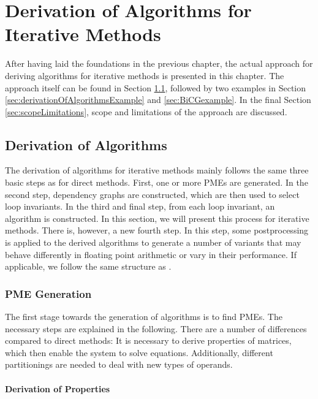 \chapter{Derivation of Algorithms for Iterative Methods}
\label{chap:derivationIM}

After having laid the foundations in the previous chapter, the actual approach for deriving algorithms for iterative methods is presented in this chapter. The approach itself can be found in Section \ref{sec:derivationIterativeMethods}, followed by two examples in Section \ref{sec:derivationOfAlgorithmsExample} and \ref{sec:BiCGexample}. In the final Section \ref{sec:scopeLimitations}, scope and limitations of the approach are discussed.

\section{Derivation of Algorithms}
\label{sec:derivationIterativeMethods}

The derivation of algorithms for iterative methods mainly follows the same three basic steps as for direct methods. First, one or more PMEs are generated. In the second step, dependency graphs are constructed, which are then used to select loop invariants. In the third and final step, from each loop invariant, an algorithm is constructed. In this section, we will present this process for iterative methods. There is, however, a new fourth step. In this step, some postprocessing is applied to the derived algorithms to generate a number of variants that may behave differently in floating point arithmetic or vary in their performance. If applicable, we follow the same structure as \cite{Fabregat-Traver:thesis}.

\subsection{PME Generation}

The first stage towards the generation of algorithms is to find PMEs. The necessary steps are explained in the following. There are a number of differences compared to direct methods: It is necessary to derive properties of matrices, which then enable the system to solve equations. Additionally, different partitionings are needed to deal with new types of operands.

\subsubsection{Derivation of Properties}

